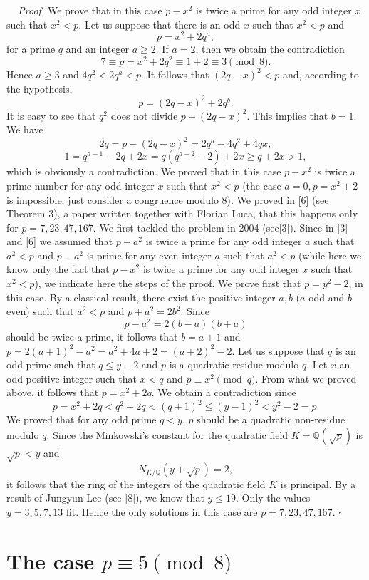 \documentclass[12pt]{article}
\newenvironment{proof}{{\it Proof.}}{\hfill $ \square $ \vskip 4mm}
\begin{document}
{$\;\;\;$ \begin{proof} We prove that in this case $p-x^2$ is twice a prime for any odd integer $x$ such that $x^2<p$. Let us suppose that there is an odd $x$ such that $x^2<p$ and $$p=x^2+2q^a,$$ for a prime $q$ and an integer $a\geq 2$. If $a=2$, then we obtain the contradiction
$$7\equiv p=x^2+2q^2\equiv 1+2 \equiv 3 \pmod 8.$$ Hence $a\geq 3$ and $4q^2<2q^a<p$. It follows that $(2q-x)^2<p$ and, according to the hypothesis, $$p=(2q-x)^2+2q^b.$$ It is easy to see that $q^2$ does not divide $p-(2q-x)^2$. This implies that $b=1$. We have 
$$2q=p-(2q-x)^2=2q^a-4q^2+4qx,$$
$$1=q^{a-1}-2q+2x=q(q^{a-2}-2)+2x\geq q+2x>1,$$ which is obviously a contradiction.
We proved that in this case $p-x^2$ is twice a prime number for any odd integer $x$ such that $x^2<p$ (the case $a=0, p=x^2+2$ is impossible; just consider a congruence modulo 8). We proved in [6] (see Theorem 3), a paper written together with Florian Luca, that this happens only for $p=7,23,47,167$. We first tackled the problem in 2004 (see[3]). Since in [3] and [6] we assumed that $p-a^2$ is twice a prime for any odd integer $a$ such that $a^2<p$ and $p-a^2$ is prime for any even integer $a$ such that $a^2<p$ (while here we know only the fact that $p-x^2$ is twice a prime for any odd integer $x$ such that $x^2<p$), we indicate here the steps of the proof. We prove first that $p=y^2-2$, in this case. By a classical result, there exist the positive integer $a,b$ ($a$ odd and $b$ even) such that $a^2<p$ and $p+a^2=2b^2$. Since $$p-a^2=2(b-a)(b+a)$$ should be twice a prime, it follows that $b=a+1$ and $p=2(a+1)^2-a^2=a^2+4a+2=(a+2)^2-2$. Let us suppose that $q$ is an odd prime such that $q\leq y-2$ and $p$ is a quadratic residue modulo $q$. Let $x$ an odd positive integer such that $x<q$ and $p\equiv x^2 \pmod q$. From what we proved above, it follows that $p=x^2+2q$. We obtain a contradiction since
$$p=x^2+2q<q^2+2q<(q+1)^2\leq (y-1)^2<y^2-2=p.$$ 
We proved that for any odd prime $q<y$, $p$ should be a quadratic non-residue modulo $q$. Since the Minkowski's constant 
for the quadratic field $K=\mathbb{Q}(\sqrt p)$ is $\sqrt p<y$ and 
$$N_{K/\mathbb{Q}}(y+\sqrt p)=2,$$ 
it follows that the ring of the integers of the quadratic field $K$ is principal. By a result of Jungyun Lee (see [8]), we know that $y\leq 19$. Only the values $y=3,5,7,13$ fit. Hence the only solutions in this case are $p=7,23,47,167$.
\end{proof}



\section{The case $p\equiv 5 \pmod 8$}

}
\end{document}
